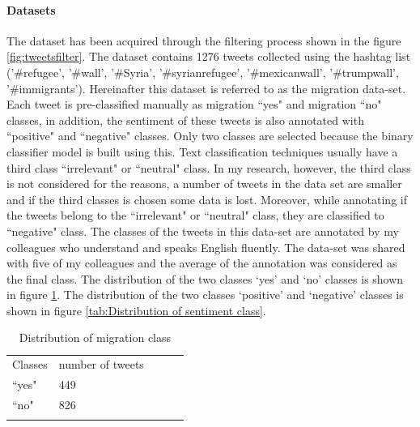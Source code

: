 \paragraph{Datasets}
The dataset has been acquired through the filtering process shown in the figure \ref{fig:tweetsfilter}. The dataset contains 1276 tweets collected using the hashtag list (’\#refugee’, ’\#wall’, ’\#Syria’, ’\#syrianrefugee’, ’\#mexicanwall’, ’\#trumpwall’, ’\#immigrants’). Hereinafter this dataset is referred to as the migration data-set. Each tweet is pre-classified manually as migration ``yes" and migration ``no" classes, in addition, the sentiment of these tweets is also annotated with ``positive" and ``negative" classes. Only two classes are selected because the binary classifier model is built using this. Text classification techniques usually have a third class ``irrelevant" or ``neutral" class. In my research, however, the third class is not considered for the reasons, a number of tweets in the data set are smaller and if the third classes is chosen some data is lost. Moreover, while annotating if the tweets belong to the ``irrelevant" or ``neutral" class, they are classified to ``negative" class. The classes of the tweets in this data-set are annotated by my colleagues who understand and speaks English fluently. The data-set was shared with five of my colleagues and the average of the annotation was considered as the final class. The distribution of the two classes `yes' and `no' classes is shown in figure \ref{tab:DistMigrationClass}. The distribution of the two classes `positive' and `negative' classes is shown in figure \ref{tab:Distribution of sentiment class}.



\begin{table}[]
\centering
\begin{tabular}{lllll}
\cline{1-2}
\multicolumn{1}{|l|}{Classes}   & \multicolumn{1}{l|}{number of tweets} &  &  &  \\ \cline{1-2}
\multicolumn{1}{|l|}{``yes"} & \multicolumn{1}{l|}{449}  &  &  &  \\ \cline{1-2}
\multicolumn{1}{|l|}{``no"}   & \multicolumn{1}{l|}{826}  &  &  &  \\ \cline{1-2}
                            &                           &  &  & 

\end{tabular}
\caption{Distribution of migration class}
\label{tab:DistMigrationClass}
\end{table}


